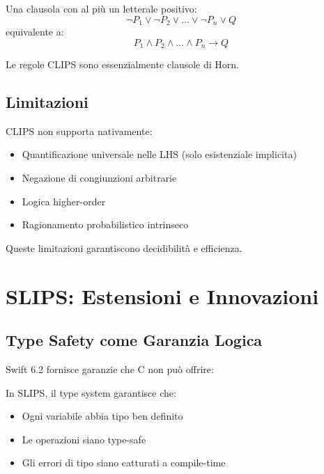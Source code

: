 \begin{definizione}
Una clausola con al più un letterale positivo:
\begin{equation}
\neg P_1 \lor \neg P_2 \lor \ldots \lor \neg P_n \lor Q
\end{equation}
equivalente a:
\begin{equation}
P_1 \land P_2 \land \ldots \land P_n \rightarrow Q
\end{equation}
\end{definizione}

Le regole CLIPS sono essenzialmente clausole di Horn.

\subsection{Limitazioni}

CLIPS non supporta nativamente:
\begin{itemize}
\item Quantificazione universale nelle LHS (solo esistenziale implicita)
\item Negazione di congiunzioni arbitrarie
\item Logica higher-order
\item Ragionamento probabilistico intrinseco
\end{itemize}

Queste limitazioni garantiscono decidibilità e efficienza.

\section{SLIPS: Estensioni e Innovazioni}

\subsection{Type Safety come Garanzia Logica}

Swift 6.2 fornisce garanzie che C non può offrire:

\begin{definizione}
In SLIPS, il type system garantisce che:
\begin{itemize}
\item Ogni variabile abbia tipo ben definito
\item Le operazioni siano type-safe
\item Gli errori di tipo siano catturati a compile-time
\end{itemize}
\end{definizione}

